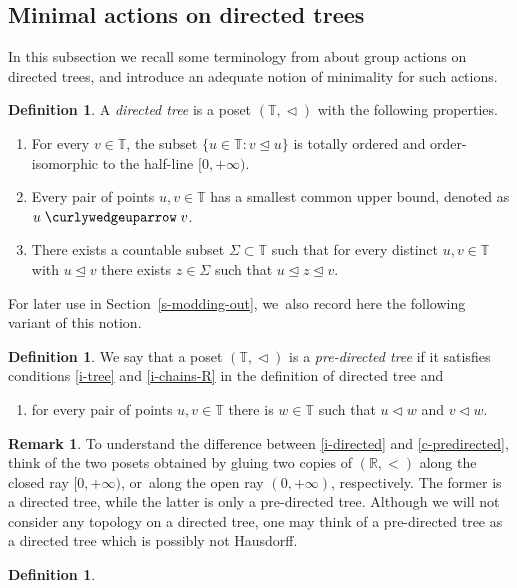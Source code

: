 \documentclass[JEP,XML,SOM,Unicode,NoFloatCountersInSection,published]{cedram}
\theoremstyle{definition}
\newtheorem{dfn}[thm]{Definition}
\newtheorem{rem}[thm]{Remark}
\newcommand{\R}{\mathbb{R}}
\newcommand{\Tbb}{\mathbb T}
\newcommand{\treeorder}{\mathrel{\triangleleft}}
\newcommand{\treeordereq}{\mathrel{\trianglelefteq}}
\newcommand{\treeup}{\mathrel{\curlywedgeuparrow}}
\begin{document}
\subsection{Minimal actions on directed trees} In this subsection we recall some terminology from \cite[Chap.\,11]{BMRT} about group actions on directed trees, and introduce an adequate notion of minimality for such actions.

\begin{dfn}\label{def d-trees}
A \emph{directed tree} is a poset $(\Tbb, \treeorder)$ with the following properties.

\begin{enumerate}
\renewcommand{\theenumi}{T\arabic{enumi}}

\item \label{i-tree} For every $v\in \Tbb$, the subset $\{u\in \Tbb : v \treeordereq u\}$ is totally ordered and order-isomorphic to the half-line $[0, +\infty)$.

\item \label{i-directed} Every pair of points $u, v\in \Tbb$ has a smallest common upper bound, denoted as $u\treeup v$.

\item \label{i-chains-R} There exists a countable subset $\Sigma \subset \Tbb$ such that for every distinct $u, v\in \Tbb$ with $u \treeordereq v$ there exists $z\in \Sigma$ such that $u\treeordereq z\treeordereq v$.
\end{enumerate}

For later use in Section~\ref{s-modding-out}, we~also record here the following variant of this notion.
\begin{dfn} \label{d-pre-directed-tree} We say that a poset $(\Tbb,\treeorder)$ is a \emph{pre-directed tree} if it satisfies conditions \eqref{i-tree} and \eqref{i-chains-R} in the definition of directed tree and
\begin{enumerate}
\renewcommand{\theenumi}{T\arabic{enumi}'}
\item \label{c-predirected} for every pair of points $u, v\in \Tbb$ there is $w\in \Tbb$ such that $u \treeorder w$ and $v\treeorder w$.
\end{enumerate}
\end{dfn}

\begin{rem} \label{r-Hausdorff} To understand the difference between \eqref{i-directed} and \eqref{c-predirected}, think of the two posets obtained by gluing two copies of $(\R, <)$ along the closed ray $[0, +\infty)$, or~along the open ray $(0, +\infty)$, respectively. The former is a directed tree, while the latter is only a pre-directed tree. Although we will not consider any topology on a directed tree, one may think of a pre-directed tree as a directed tree which is possibly not Hausdorff.
\end{rem}
\begin{dfn} \label{d-tree-horograding}


\end{dfn}
\end{dfn}
\end{document}
